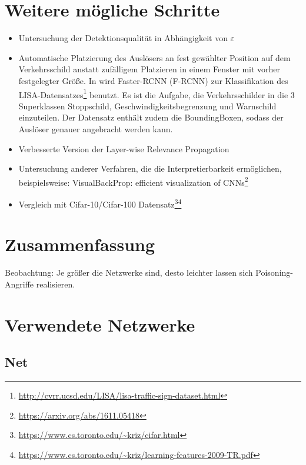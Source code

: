 \documentclass[twoside, 11pt,a4paper]{article}
\numberwithin{equation}{section}
\begin{document}
	\section{Weitere mögliche Schritte} \label{chapter_weitereSchritte}
	\begin{itemize}
		\item Untersuchung der Detektionsqualität in Abhängigkeit von $\varepsilon$
		\item Automatische Platzierung des Auslösers an fest gewählter Position auf dem Verkehrsschild anstatt zufälligem Platzieren in einem Fenster mit vorher festgelegter Größe. In \cite{badnets} wird  Faster-RCNN (F-RCNN) zur Klassifikation des LISA-Datensatzes\footnote{\url{http://cvrr.ucsd.edu/LISA/lisa-traffic-sign-dataset.html}} benutzt. Es ist die Aufgabe, die Verkehrsschilder in die 3 Superklassen Stoppschild, Geschwindigkeitsbegrenzung und Warnschild einzuteilen. Der Datensatz enthält zudem die BoundingBoxen, sodass der Auslöser genauer angebracht werden kann.
		\item Verbesserte Version der Layer-wise Relevance Propagation
		\item Untersuchung anderer Verfahren, die die Interpretierbarkeit ermöglichen, beispielsweise: VisualBackProp: efficient visualization of CNNs\footnote{\url{https://arxiv.org/abs/1611.05418}}
		\item Vergleich mit Cifar-10/Cifar-100 Datensatz\footnote{\url{https://www.cs.toronto.edu/~kriz/cifar.html}}\footnote{\url{https://www.cs.toronto.edu/~kriz/learning-features-2009-TR.pdf}}
	\end{itemize}
	
	
	\section{Zusammenfassung} \label{chapter_conclusion}
	Beobachtung: Je größer die Netzwerke sind, desto leichter lassen sich Poisoning-Angriffe realisieren.
	
	\printglossaries
	\newpage
	\appendix
	\section{Verwendete Netzwerke}
	\subsection{Net}
	
\end{document}
